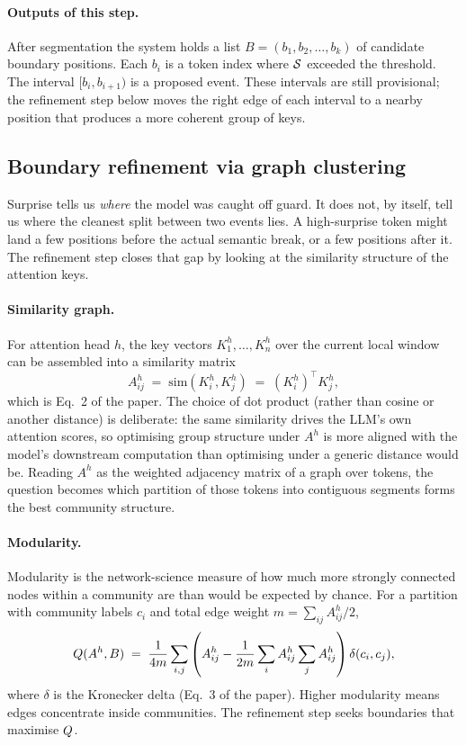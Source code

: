 \paragraph{Outputs of this step.}
After segmentation the system holds a list $B = (b_1, b_2, \dots, b_k)$ of candidate boundary positions. Each $b_i$ is a token index where $\mathcal{S}$ exceeded the threshold. The interval $[b_i, b_{i+1})$ is a proposed event. These intervals are still provisional; the refinement step below moves the right edge of each interval to a nearby position that produces a more coherent group of keys.

\subsection{Boundary refinement via graph clustering}
\label{sec:method-refinement}

Surprise tells us \emph{where} the model was caught off guard. It does not, by itself, tell us where the cleanest split between two events lies. A high-surprise token might land a few positions before the actual semantic break, or a few positions after it. The refinement step closes that gap by looking at the similarity structure of the attention keys.

\paragraph{Similarity graph.}
For attention head $h$, the key vectors $K^h_1, \dots, K^h_n$ over the current local window can be assembled into a similarity matrix
\begin{equation}
  A^h_{ij} \;=\; \mathrm{sim}(K^h_i, K^h_j) \;=\; (K^h_i)^\top K^h_j,
  \label{eq:adjacency}
\end{equation}
which is Eq.\ 2 of the paper. The choice of dot product (rather than cosine or another distance) is deliberate: the same similarity drives the LLM's own attention scores, so optimising group structure under $A^h$ is more aligned with the model's downstream computation than optimising under a generic distance would be. Reading $A^h$ as the weighted adjacency matrix of a graph over tokens, the question becomes which partition of those tokens into contiguous segments forms the best community structure.

\paragraph{Modularity.}
Modularity is the network-science measure of how much more strongly connected nodes within a community are than would be expected by chance. For a partition with community labels $c_i$ and total edge weight $m = \sum_{ij} A^h_{ij}/2$,
\begin{equation}
  Q(A^h, B) \;=\; \frac{1}{4m} \sum_{i,j} \left( A^h_{ij} - \frac{1}{2m} \sum_i A^h_{ij} \sum_j A^h_{ij} \right) \delta(c_i, c_j),
  \label{eq:modularity}
\end{equation}
where $\delta$ is the Kronecker delta (Eq.\ 3 of the paper). Higher modularity means edges concentrate inside communities. The refinement step seeks boundaries that maximise $Q$.


